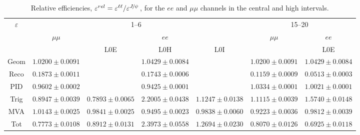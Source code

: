 \begin{landscape}
\begin{table}
\centering
\caption{Relative efficiencies, $\varepsilon^{rel} = \varepsilon^{\ell\ell} / \varepsilon^{\jpsi}$,
for the $ee$ and $\mu\mu$ channels in the central and high \qsq intervals.}
\begin{tabular}{|c|c|c|c|c|c|c|}
\hline \multirow{3}{*}{$\varepsilon$}  			&  \multicolumn{4}{c|}{1--6~\gevgevcccc}  				& \multicolumn {2}{c|}{15--20~\gevgevcccc}  \\ \cline{2-7}
 				&	  $\mu\mu$  				& \multicolumn {3}{c|}{$ee$} 			&  $\mu\mu$  				& \multicolumn {1}{c|}{$ee$} \\ \cline{2-7}
				&   &  L0E 	& L0H 	& L0I    &  	& L0E 	\\ \hline
Geom  & $ 1.0200 \pm 0.0091$ & \multicolumn{3}{c|}{$ 1.0429 \pm 0.0084$} & $ 1.0200 \pm 0.0091$ & \multicolumn{1}{c|}{$ 1.0429 \pm 0.0084$} \\
Reco  & $ 0.1873 \pm 0.0011$ & \multicolumn{3}{c|}{$ 0.1743 \pm 0.0006$} & $ 0.1159 \pm 0.0009$ & \multicolumn{1}{c|}{$ 0.0513 \pm 0.0003$} \\
PID  & $ 0.9602 \pm 0.0002$ & \multicolumn{3}{c|}{$ 0.9425 \pm 0.0001$} & $ 1.0334 \pm 0.0001$ & \multicolumn{1}{c|}{$ 1.0021 \pm 0.0001$} \\
\hline
Trig  & $ 0.8947 \pm 0.0039 $ & $ 0.7893 \pm 0.0065 $ & $ 2.2005 \pm 0.0438 $ & $ 1.1247 \pm 0.0138 $ & $ 1.1115 \pm 0.0039 $ & $ 1.5740 \pm 0.0148 $ \\ 
MVA  & $ 1.0143 \pm 0.0025 $ & $ 0.9841 \pm 0.0025 $ & $ 0.9495 \pm 0.0023 $ & $ 0.9838 \pm 0.0060 $ & $ 0.9223 \pm 0.0036 $ & $ 0.9812 \pm 0.0039 $ \\  
\hline
Tot  & $ 0.7773 \pm 0.0108 $ & $ 0.8912 \pm 0.0131 $ & $ 2.3973 \pm 0.0558 $ & $ 1.2694 \pm 0.0230 $ & $ 0.8070 \pm 0.0126 $ & $ 0.6925 \pm 0.0118 $ \\  
\hline
\end{tabular}\label{tab:RKst_releff}
\end{table}

\end{landscape}

